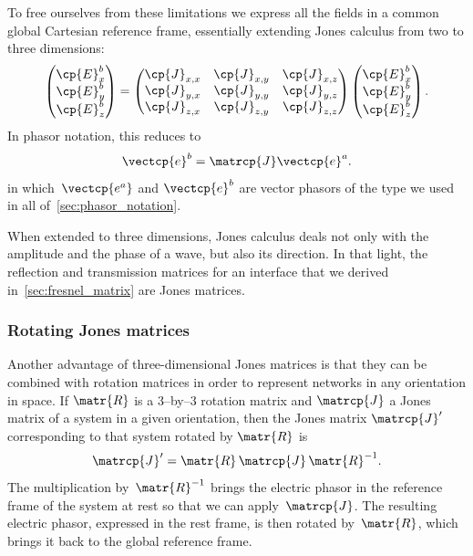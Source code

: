 \begin{refsection}
To free ourselves from these limitations we express all the fields in a common global Cartesian reference frame, essentially extending Jones calculus from two to three dimensions:
\begin{equation}
    \begin{pmatrix}
        \cp{E}^b_x\\
        \cp{E}^b_y\\
        \cp{E}^b_z
    \end{pmatrix}
    =
    \begin{pmatrix}
        \cp{J}_{x, x}   &   \cp{J}_{x, y}   &   \cp{J}_{x, z} \\
        \cp{J}_{y, x}   &   \cp{J}_{y, y}   &   \cp{J}_{y, z} \\
        \cp{J}_{z, x}   &   \cp{J}_{z, y}   &   \cp{J}_{z, z}
    \end{pmatrix}
    \begin{pmatrix}
        \cp{E}^b_x\\
        \cp{E}^b_y\\
        \cp{E}^b_z
    \end{pmatrix}
    \text{.}
    \label{eq:jones_matrix_3d}
\end{equation}
In phasor notation, this reduces to
\begin{equation}
    \vectcp{e}^b = \matrcp{J} \vectcp{e}^a
    \text{.}
\end{equation}
in which~$\vectcp{e^a}$ and $\vectcp{e}^b$ are vector phasors of the type we used in all of~\cref{sec:phasor_notation}.

When extended to three dimensions, Jones calculus deals not only with the amplitude and the phase of a wave, but also its direction.
In that light, the reflection and transmission matrices for an interface that we derived in~\vref{sec:fresnel_matrix} are Jones matrices.



\subsubsection{Rotating Jones matrices}
\label{sec:rotating_jones_matrices}

Another advantage of three-dimensional Jones matrices is that they can be combined with rotation matrices in order to represent networks in any orientation in space.
If $\matr{R}$ is a 3--by--3 rotation matrix and $\matrcp{J}$ a Jones matrix of a system in a given orientation,
then the Jones matrix $\matrcp{J}'$ corresponding to that system rotated by $\matr{R}$ is
\begin{equation}
    \matrcp{J}' = \matr{R} \, \matrcp{J} \, \matr{R}^{-1}
    \text{.}
    \label{eq:jones_rotation_using_inverse}
\end{equation}
The multiplication by~$\matr{R}^{-1}$ brings the electric phasor in the reference frame of the system at rest so that we can apply~$\matrcp{J}$.
The resulting electric phasor, expressed in the rest frame, is then rotated by~$\matr{R}$, which brings it back to the global reference frame.


\end{refsection}

